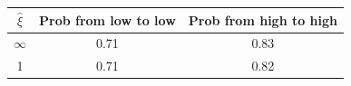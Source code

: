 \begin{tabular}{ccc}
\hline
\rule{0pt}{1.2em}
$\widehat \xi$  &Prob from low to low& Prob from high to high \\
\hline
$\infty$ &  0.71 & 0.83 \\
1   &  0.71 & 0.82  \\



\hline
\end{tabular}